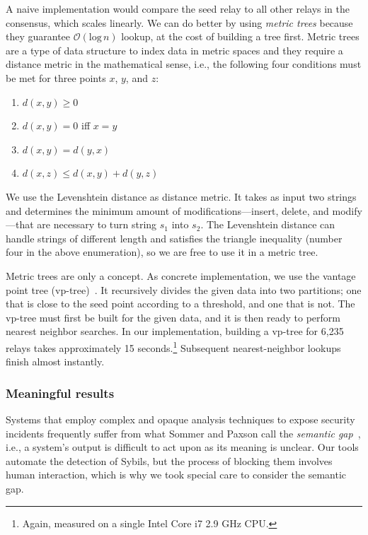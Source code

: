 A naive implementation would compare the seed relay to all other relays in the
consensus, which scales linearly.  We can do better by using \emph{metric trees}
because they guarantee $\mathcal{O}(\textrm{log}\,n)$ lookup, at the cost of
building a tree first.  Metric trees are a type of data structure to index data
in metric spaces and they require a distance metric in the mathematical sense,
i.e., the following four conditions must be met for three points $x$, $y$, and
$z$:
\begin{enumerate}
	\item $d(x, y) \geq 0$
	\item $d(x, y) = 0$ iff $x = y$
	\item $d(x, y) = d(y, x)$
	\item $d(x, z) \leq d(x, y) + d(y, z)$
\end{enumerate}

We use the Levenshtein distance as distance metric.  It takes as input two
strings and determines the minimum amount of modifications---insert, delete, and
modify---that are necessary to turn string $s_{1}$ into $s_{2}$.  The
Levenshtein distance can handle strings of different length and satisfies the
triangle inequality (number four in the above enumeration), so we are free to
use it in a metric tree.

Metric trees are only a concept.  As concrete implementation, we use the vantage
point tree (vp-tree)~\cite{Yianilos1993a}.  It recursively divides the given
data into two partitions; one that is close to the seed point according to a
threshold, and one that is not.  The vp-tree must first be built for the given
data, and it is then ready to perform nearest neighbor searches.  In our
implementation, building a vp-tree for 6,235 relays takes approximately 15
seconds.\footnote{Again, measured on a single Intel Core i7 2.9 GHz CPU.}
Subsequent nearest-neighbor lookups finish almost instantly.


\subsubsection{Meaningful results}
Systems that employ complex and opaque analysis techniques to expose security
incidents frequently suffer from what Sommer and Paxson call the \emph{semantic
gap}~\cite[\S III.C]{Sommer2010a}, i.e., a system's output is difficult to act
upon as its meaning is unclear.  Our tools automate the detection of Sybils,
but the process of blocking them involves human interaction, which is why we
took special care to consider the semantic gap.

